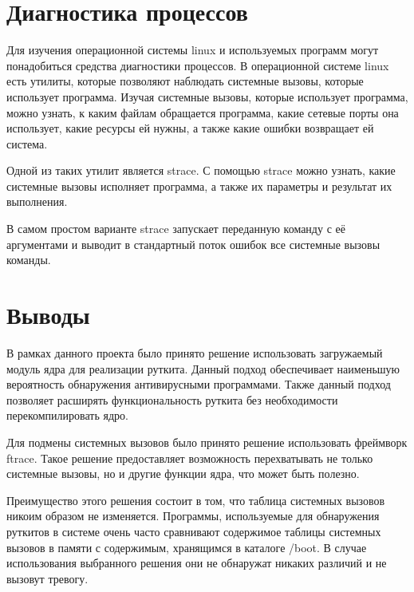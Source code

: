 \section{Диагностика процессов}%
\label{sec:diagnostika_protsessov}

Для изучения операционной системы linux и используемых программ могут понадобиться средства диагностики процессов. В операционной системе linux есть утилиты, которые позволяют наблюдать системные вызовы, которые использует программа. Изучая системные вызовы, которые использует программа, можно узнать, к каким файлам обращается программа, какие сетевые порты она использует, какие ресурсы ей нужны, а также какие ошибки возвращает ей система.

Одной из таких утилит является strace. С помощью strace можно узнать, какие системные вызовы исполняет программа, а также их параметры и результат их выполнения.

В самом простом варианте strace запускает переданную команду с её аргументами и выводит в стандартный поток ошибок все системные вызовы команды.


\section*{Выводы}%
\label{sec:vyvody}

В рамках данного проекта было принято решение использовать загружаемый модуль ядра для реализации руткита. Данный подход обеспечивает наименьшую вероятность обнаружения антивирусными программами. Также данный подход позволяет расширять функциональность руткита без необходимости перекомпилировать ядро.

Для подмены системных вызовов было принято решение использовать фреймворк ftrace. Такое решение предоставляет возможность перехватывать не только системные вызовы, но и другие функции ядра, что может быть полезно.

Преимущество этого решения состоит в том, что таблица системных вызовов никоим образом не изменяется. Программы, используемые для обнаружения руткитов в системе очень часто сравнивают содержимое таблицы системных вызовов в памяти с содержимым, хранящимся в каталоге /boot. В случае использования выбранного решения они не обнаружат никаких различий и не вызовут тревогу.
